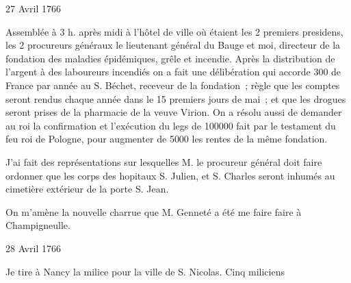                      \begin{diary}{27 Avril 1766}{}
                        
                         Assemblée à 3 h. après midi à l'hôtel de ville
                           où étaient les 2
                              premiers presidens, les
                           2 procureurs généraux
                           le lieutenant général du
                              Bauge
                           et moi, directeur de la fondation des
                              maladies épidémiques, grêle et incendie.
                           Après la distribution de l'argent à des laboureurs
                           incendiés on a fait une délibération qui accorde
                           300 de France par année au S. Béchet, receveur
                           de la fondation ; règle que les comptes seront
                           rendus chaque année dans le 15 premiers
                           jours de mai ; et que les drogues seront
                           prises de la pharmacie de la veuve
                              Virion.
                           On a résolu aussi de demander au roi la
                           confirmation et l'exécution du legs de 100000
                           fait par le testament du feu
                              roi de Pologne,
                           pour augmenter de 5000 les rentes de la
                           même fondation. \bigskip
        
        
                         J'ai fait des représentations sur
                           lesquelles M. le
                              procureur général doit faire ordonner que les corps des
                           hopitaux S.
                              Julien, et S.
                              Charles seront inhumés
                           au cimetière
                              extérieur de la porte S. Jean. \bigskip
        
        
                         On m'amène la nouvelle charrue que
                           M. Genneté a été me faire faire
                           à
                           Champigneulle. \bigskip
        
        
                     \end{diary}

                     \begin{diary}{28 Avril 1766}{}
                        
                         Je tire à Nancy
                           la milice pour la ville
                           de S. Nicolas. Cinq
                           miliciens \bigskip
        
        
                     \end{diary}

